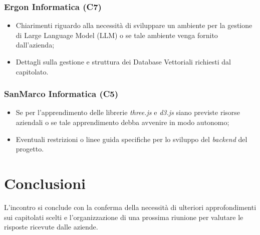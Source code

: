 \documentclass[a4paper, 12pt]{article}
\begin{document}
\subsubsection{Ergon Informatica (C7)}
\begin{itemize}
    \item Chiarimenti riguardo alla necessità di sviluppare un ambiente per la gestione di Large Language Model (LLM) o se tale ambiente venga fornito dall'azienda;
    \item Dettagli sulla gestione e struttura dei Database Vettoriali richiesti dal capitolato.
\end{itemize}

\subsubsection{SanMarco Informatica (C5)}
\begin{itemize}
    \item Se per l’apprendimento delle librerie \textit{three.js} e \textit{d3.js} siano previste risorse aziendali o se tale apprendimento debba avvenire in modo autonomo; 
    \item Eventuali restrizioni o linee guida specifiche per lo sviluppo del \textit{backend} del progetto. 
\end{itemize}

\section{Conclusioni}
L’incontro si conclude con la conferma della necessità di ulteriori approfondimenti sui capitolati scelti e l’organizzazione di una prossima riunione per valutare le risposte ricevute dalle aziende.
\end{document}
